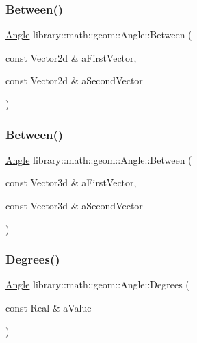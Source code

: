 \subsubsection{\texorpdfstring{Between()}{Between()}\hspace{0.1cm}{\footnotesize\ttfamily [1/2]}}
{\footnotesize\ttfamily \hyperlink{classlibrary_1_1math_1_1geom_1_1_angle}{Angle} library\+::math\+::geom\+::\+Angle\+::\+Between (\begin{DoxyParamCaption}\item[{const Vector2d \&}]{a\+First\+Vector,  }\item[{const Vector2d \&}]{a\+Second\+Vector }\end{DoxyParamCaption})\hspace{0.3cm}{\ttfamily [static]}}

\mbox{\label{classlibrary_1_1math_1_1geom_1_1_angle_a4e409c07a68dede373aa1400605983fe}} 
\subsubsection{\texorpdfstring{Between()}{Between()}\hspace{0.1cm}{\footnotesize\ttfamily [2/2]}}
{\footnotesize\ttfamily \hyperlink{classlibrary_1_1math_1_1geom_1_1_angle}{Angle} library\+::math\+::geom\+::\+Angle\+::\+Between (\begin{DoxyParamCaption}\item[{const Vector3d \&}]{a\+First\+Vector,  }\item[{const Vector3d \&}]{a\+Second\+Vector }\end{DoxyParamCaption})\hspace{0.3cm}{\ttfamily [static]}}

\mbox{\label{classlibrary_1_1math_1_1geom_1_1_angle_a64aa53e8420aeb6f671d86c65c370bc8}} 
\subsubsection{\texorpdfstring{Degrees()}{Degrees()}}
{\footnotesize\ttfamily \hyperlink{classlibrary_1_1math_1_1geom_1_1_angle}{Angle} library\+::math\+::geom\+::\+Angle\+::\+Degrees (\begin{DoxyParamCaption}\item[{const Real \&}]{a\+Value }\end{DoxyParamCaption})\hspace{0.3cm}{\ttfamily [static]}}

